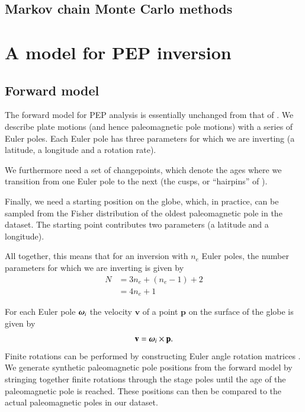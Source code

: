 \documentclass[preprint,12pt,authoryear]{elsarticle}
\newcommand{\mitbf}[1]{\hbox{\mathversion{bold}$#1$}}
\begin{document}
\subsection{Markov chain Monte Carlo methods}

\section{A model for PEP inversion}
\label{sec:model}
\subsection{Forward model}
The forward model for PEP analysis is essentially unchanged from that of \citet{gordon1984paleomagnetic}.
We describe plate motions (and hence paleomagnetic pole motions) with a series of Euler poles.
Each Euler pole has three parameters for which we are inverting (a latitude, a longitude and a rotation rate).

We furthermore need a set of changepoints, which denote the ages where we transition from 
one Euler pole to the next (the cusps, or ``hairpins'' of \citet{irving1972hairpins}).

Finally, we need a starting position on the globe, which, in practice, can be sampled
from the Fisher distribution of the oldest paleomagnetic pole in the dataset.
The starting point contributes two parameters (a latitude and a longitude).

All together, this means that for an inversion with $n_e$ Euler poles, 
the number parameters for which we are inverting is given by
\begin{equation}
\begin{aligned}
N &= 3 n_e + (n_e -1) + 2 \\
 &= 4 n_e + 1
\end{aligned}
\label{eq:n_parameters}
\end{equation}

For each Euler pole $\mitbf{\omega}_i$ the velocity $\mathbf{v}$ of a point 
$\mathbf{p}$ on the surface of the globe is given by
\begin{equation}
\mathbf{v} = \mitbf{\omega}_i \times \mathbf{p}.
\label{eq:rigid_rotation}
\end{equation}
Finite rotations can be performed by constructing Euler angle rotation matrices \citep[cf.][]{goldstein1965classical}. 
We generate synthetic paleomagnetic pole positions from the forward model by stringing together
finite rotations through the stage poles until the age of the paleomagnetic pole
is reached. These positions can then be compared to the actual paleomagnetic poles in our dataset.
\end{document}
